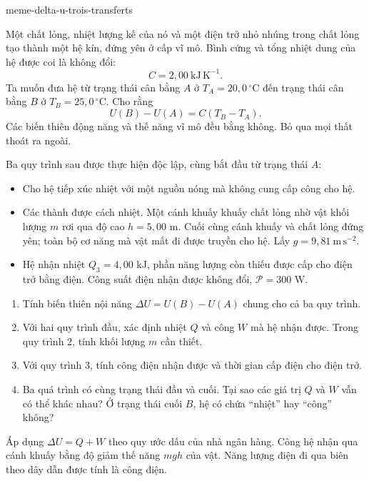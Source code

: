 \begin{exo}{meme-delta-u-trois-transferts}

Một chất lỏng, nhiệt lượng kế của nó và một điện trở nhỏ nhúng trong chất lỏng tạo thành
một hệ kín, đứng yên ở cấp vĩ mô. Bình cứng và tổng nhiệt dung của hệ được coi là không đổi:
\[
C=2{,}00\ \mathrm{kJ\,K^{-1}}.
\]
Ta muốn đưa hệ từ trạng thái cân bằng $A$ ở $T_A=20{,}0\,^\circ\mathrm{C}$
đến trạng thái cân bằng $B$ ở $T_B=25{,}0\,^\circ\mathrm{C}$. Cho rằng
\[
U(B)-U(A)=C(T_B-T_A).
\]
Các biến thiên động năng và thế năng vĩ mô đều bằng không. Bỏ qua mọi thất thoát ra ngoài.

Ba quy trình sau được thực hiện độc lập, cùng bắt đầu từ trạng thái $A$:
\begin{itemize}
\item[Quy trình 1] Cho hệ tiếp xúc nhiệt với một nguồn nóng mà không cung cấp công cho hệ.
\item[Quy trình 2] Các thành được cách nhiệt. Một cánh khuấy khuấy chất lỏng nhờ vật khối lượng $m$ rơi qua độ cao $h=5{,}00$ m. Cuối cùng cánh khuấy và chất lỏng đứng yên; toàn bộ cơ năng mà vật mất đi được truyền cho hệ. Lấy $g=9{,}81\ \mathrm{m\,s^{-2}}$.
\item[Quy trình 3] Hệ nhận nhiệt $Q_3=4{,}00$ kJ, phần năng lượng còn thiếu được cấp cho điện trở bằng điện. Công suất điện nhận được không đổi, $\mathcal P=300$ W.
\end{itemize}

\begin{enumerate}
\item Tính biến thiên nội năng $\Delta U=U(B)-U(A)$ chung cho cả ba quy trình.
\item Với hai quy trình đầu, xác định nhiệt $Q$ và công $W$ mà hệ nhận được. Trong quy trình 2, tính khối lượng $m$ cần thiết.
\item Với quy trình 3, tính công điện nhận được và thời gian cấp điện cho điện trở.
\item Ba quá trình có cùng trạng thái đầu và cuối. Tại sao các giá trị $Q$ và $W$ vẫn có thể khác nhau? Ở trạng thái cuối $B$, hệ có chứa “nhiệt” hay “công” không?
\end{enumerate}

\begin{indication}
Áp dụng $\Delta U=Q+W$ theo quy ước dấu của nhà ngân hàng. Công hệ nhận qua cánh khuấy
bằng độ giảm thế năng $mgh$ của vật. Năng lượng điện đi qua biên theo dây dẫn được tính là công điện.
\end{indication}


\end{exo}
